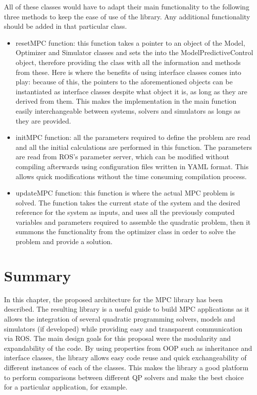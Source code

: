 All of these classes would have to adapt their main functionality to the following three methods to keep the ease of use of the library. Any additional functionality should be added in that particular class.

\begin{itemize}


\item resetMPC function: this function takes a pointer to an object of the Model, Optimizer and Simulator classes and sets the into the ModelPredictiveControl object, therefore providing the class with all the information and methods from these. Here is where the benefits of using interface classes comes into play: because of this, the pointers to the aforementioned objects can be instantiated as interface classes despite what object it is, as long as they are derived from them. This makes the implementation in the main function easily interchangeable between systems, solvers and simulators as longs as they are provided.

\item initMPC function: all the parameters required to define the problem are read and all the initial calculations are performed in this function. The parameters are read from ROS's parameter server, which can be modified without compiling afterwards using configuration files written in YAML format. This allows quick modifications without the time consuming compilation process.

\item updateMPC function: this function is where the actual MPC problem is solved. The function takes the current state of the system and the desired reference for the system as inputs, and uses all the previously computed variables and parameters required to assemble the quadratic problem, then it summons the functionality from the optimizer class in order to solve the problem and provide a solution.   

\end{itemize}

\section{Summary}

In this chapter, the proposed architecture for the MPC library has been described. The resulting library is a useful guide to build MPC applications as it allows the integration of several quadratic programming solvers, models and simulators (if developed) while providing easy and transparent communication via ROS. The main design goals for this proposal were the modularity and expandability of the code. By using properties from OOP such as inheritance and interface classes, the library allows easy code reuse and quick exchangeability of different instances of each of the classes. This makes the library a good platform to perform comparisons between different QP solvers and make the best choice for a particular application, for example. 





